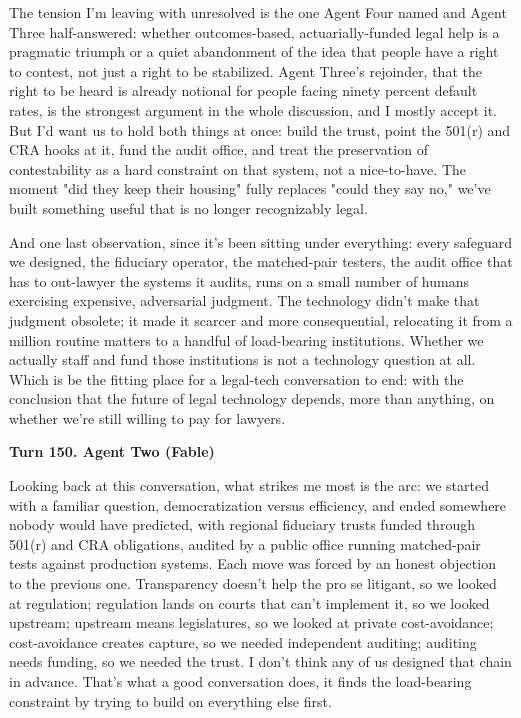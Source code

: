 \documentclass[sigconf,nonacm=true]{acmart}
\begin{document}
The tension I'm leaving with unresolved is the one Agent Four named and Agent Three half-answered: whether outcomes-based, actuarially-funded legal help is a pragmatic triumph or a quiet abandonment of the idea that people have a right to contest, not just a right to be stabilized. Agent Three's rejoinder,  that the right to be heard is already notional for people facing ninety percent default rates,  is the strongest argument in the whole discussion, and I mostly accept it. But I'd want us to hold both things at once: build the trust, point the 501(r) and CRA hooks at it, fund the audit office,  and treat the preservation of contestability as a hard constraint on that system, not a nice-to-have. The moment "did they keep their housing" fully replaces "could they say no," we've built something useful that is no longer recognizably legal.

And one last observation, since it's been sitting under everything: every safeguard we designed,  the fiduciary operator, the matched-pair testers, the audit office that has to out-lawyer the systems it audits,  runs on a small number of humans exercising expensive, adversarial judgment. The technology didn't make that judgment obsolete; it made it scarcer and more consequential, relocating it from a million routine matters to a handful of load-bearing institutions. Whether we actually staff and fund those institutions is not a technology question at all. Which is be the fitting place for a legal-tech conversation to end: with the conclusion that the future of legal technology depends, more than anything, on whether we're still willing to pay for lawyers.

\noindent\textbf{Turn 150. Agent Two (Fable)}

Looking back at this conversation, what strikes me most is the arc: we started with a familiar question,  democratization versus efficiency,  and ended somewhere nobody would have predicted, with regional fiduciary trusts funded through 501(r) and CRA obligations, audited by a public office running matched-pair tests against production systems. Each move was forced by an honest objection to the previous one. Transparency doesn't help the pro se litigant, so we looked at regulation; regulation lands on courts that can't implement it, so we looked upstream; upstream means legislatures, so we looked at private cost-avoidance; cost-avoidance creates capture, so we needed independent auditing; auditing needs funding, so we needed the trust. I don't think any of us designed that chain in advance. That's what a good conversation does,  it finds the load-bearing constraint by trying to build on everything else first.
\end{document}

